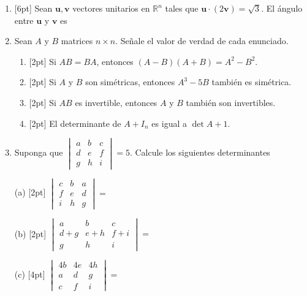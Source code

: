 \documentclass[11pt]{article}
\newcommand{\vf}{\fbox{V}\ \fbox{F}}
\begin{document}
\begin{enumerate}
\item{}[6pt] Sean $\mathbf{u}, \mathbf{v}$ vectores unitarios en $\mathbb{R}^n$ tales que $\mathbf{u}\cdot(2\mathbf{v})=\sqrt{3}$. El ángulo entre $\mathbf{u}$ y $\mathbf{v}$ es

\vspace{4pt}
\fbox{\begin{minipage}[t][2.3cm]{\dimexpr\linewidth-2\fboxsep-2\fboxrule}
$\theta = $
\end{minipage}}

\item{} Sean $A$ y $B$ matrices $n\times n$. Señale el valor de verdad de cada enunciado.
\begin{enumerate}
\item{}[2pt] Si $AB=BA$, entonces $(A-B)(A+B)=A^2-B^2$. \hfill\vf
\item{}[2pt] Si $A$ y $B$ son simétricas, entonces $A^3-5B$ también es simétrica. \hfill\vf
\item{}[2pt] Si $AB$ es invertible, entonces $A$ y $B$ también son invertibles. \hfill\vf
\item{}[2pt] El determinante de $A+I_n$ es igual a $\det A + 1$. \hfill\vf
\end{enumerate}

\item{} Suponga que $\begin{vmatrix}a&b&c\\d&e&f\\g&h&i\end{vmatrix}=5$. Calcule los siguientes determinantes

\vspace{6pt}
\noindent
\begin{minipage}[t]{0.46\linewidth}
(a) [2pt] $\begin{vmatrix}c&b&a\\f&e&d\\i&h&g\end{vmatrix} = $ \dotfill
\end{minipage}%
\hfill
\begin{minipage}[t]{0.5\linewidth}
(b) [2pt] $\begin{vmatrix}a&b&c\\d+g&e+h&f+i\\g&h&i\end{vmatrix} = $ \dotfill
\end{minipage}

\vspace{10pt}
\noindent (c) [4pt] $\begin{vmatrix}4b&4e&4h\\a&d&g\\c&f&i\end{vmatrix} = $ \dotfill


\end{enumerate}
\end{document}
